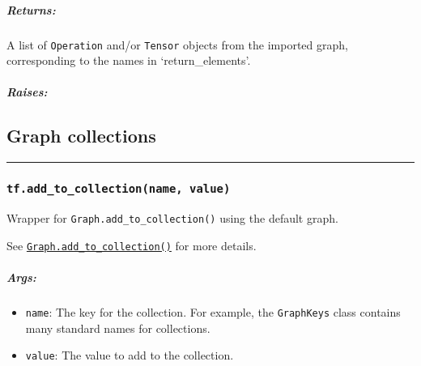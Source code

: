 \subparagraph{Returns: }\label{returns-29}

A list of \lstinline{Operation} and/or \lstinline{Tensor} objects from the
imported graph, corresponding to the names in `return_elements'.

\subparagraph{Raises: }\label{raises-15}


\subsection{Graph collections }\label{graph-collections}

\begin{center}\rule{0.5\linewidth}{\linethickness}\end{center}

\subsubsection{\texorpdfstring{\lstinline{tf.add_to_collection(name, value)}
}{tf.add_to_collection(name, value) }}\label{tf.addux5ftoux5fcollectionname-value}

Wrapper for \lstinline{Graph.add_to_collection()} using the default
graph.

See
\href{../../api_docs/python/framework.md\#Graph.add_to_collection}{\lstinline{Graph.add_to_collection()}}
for more details.

\subparagraph{Args: }\label{args-26}

\begin{itemize}
\tightlist
\item
  \lstinline{name}: The key for the collection. For example, the
  \lstinline{GraphKeys} class contains many standard names for collections.
\item
  \lstinline{value}: The value to add to the collection.
\end{itemize}

